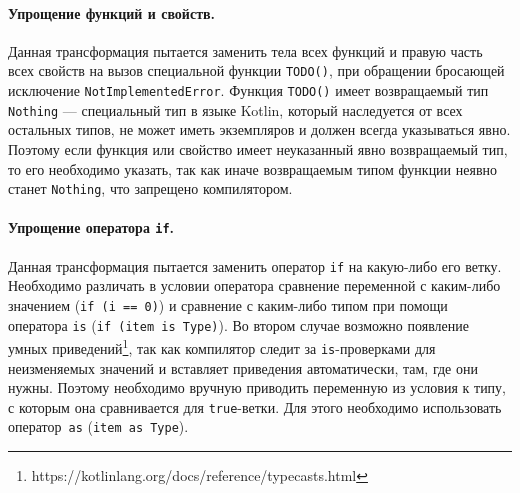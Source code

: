 \paragraph{Упрощение функций и свойств.} Данная трансформация пытается заменить тела всех функций и правую часть всех свойств на вызов специальной функции \texttt{TODO()}, при обращении бросающей исключение \texttt{NotImplementedError}. Функция \texttt{TODO()} имеет возвращаемый тип \texttt{Nothing} --- специальный тип в языке Kotlin, который наследуется от всех остальных типов, не может иметь экземпляров и должен всегда указываться явно. Поэтому если функция или свойство имеет неуказанный явно возвращаемый тип, то его необходимо указать, так как иначе возвращаемым типом функции неявно станет \texttt{Nothing}, что запрещено компилятором.

\paragraph{Упрощение оператора \texttt{if}.} Данная трансформация пытается заменить оператор \texttt{if} на какую-либо его ветку. Необходимо различать в условии оператора сравнение переменной с каким-либо значением (\texttt{if (i == 0)}) и сравнение с каким-либо типом при помощи оператора \texttt{is} (\texttt{if (item is Type)}). Во втором случае возможно появление умных приведений\footnote{https://kotlinlang.org/docs/reference/typecasts.html}, так как компилятор следит за \texttt{is}-проверками для неизменяемых значений и вставляет приведения автоматически, там, где они нужны. Поэтому необходимо вручную приводить переменную из условия к типу, с которым она сравнивается для \texttt{true}-ветки. Для этого необходимо использовать оператор~\texttt{as} (\texttt{item as Type}).

